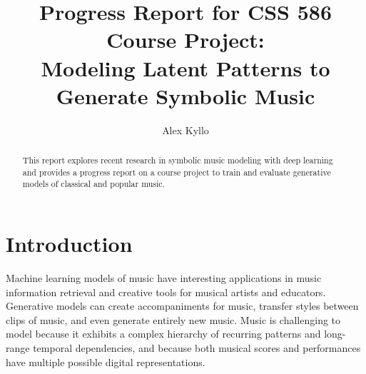 \documentclass[sigconf,authorversion]{acmart}
\begin{document}
\renewcommand\footnotetextcopyrightpermission[1]{}
\pagestyle{plain}
\title{Progress Report for CSS 586 Course Project: \\
Modeling Latent Patterns to Generate Symbolic Music}


\author{Alex Kyllo}

\begin{abstract}
  This report explores recent research in symbolic music modeling with
  deep learning and provides a progress report on a course project to
  train and evaluate generative models of classical and popular music.
\end{abstract}


\maketitle

\section{Introduction}

Machine learning models of music have interesting applications in
music information retrieval and creative tools for musical artists and
educators. Generative models can create accompaniments for music,
transfer styles between clips of music, and even generate entirely new
music. Music is challenging to model because it exhibits a complex
hierarchy of recurring patterns and long-range temporal dependencies,
and because both musical scores and performances have multiple
possible digital representations.
\end{document}
